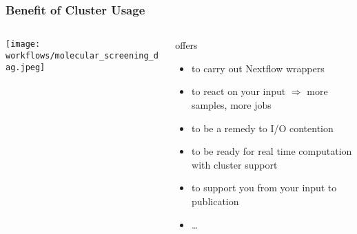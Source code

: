 \begin{frame}
   \frametitle{Benefit of Cluster Usage}
   \begin{columns}
   	 \begin{column}{0.6\textwidth}
   	 	\centering
   	 	\texttt{[image: workflows/molecular\_screening\_dag.jpeg]}
   	 \end{column}
     \begin{column}{0.6\textwidth}
     	{\footnotesize
     		\Snakemake offers
     		\begin{itemize}[<+->]
     		  \item to carry out Nextflow wrappers
     		  \item to react on your input \newline $\Rightarrow$  more samples, more jobs
     		  \item to be a remedy to I/O contention
     		  \item to be ready for real time \newline computation with cluster support
     		  \item to support you from your input \newline to publication
     		  \item \ldots
     		\end{itemize}
     	}
     \end{column}
   \end{columns}
\end{frame}
	